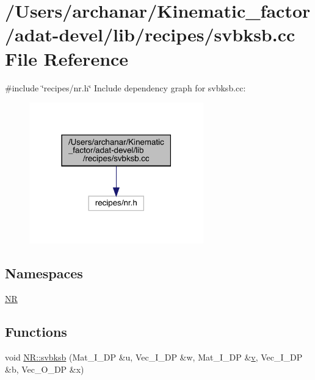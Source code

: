 \hypertarget{adat-devel_2lib_2recipes_2svbksb_8cc}{}\section{/\+Users/archanar/\+Kinematic\+\_\+factor/adat-\/devel/lib/recipes/svbksb.cc File Reference}
\label{adat-devel_2lib_2recipes_2svbksb_8cc}
{\ttfamily \#include \char`\"{}recipes/nr.\+h\char`\"{}}\newline
Include dependency graph for svbksb.\+cc\+:
\nopagebreak
\begin{figure}[H]
\begin{center}
\leavevmode
\includegraphics[width=214pt]{dd/d5b/adat-devel_2lib_2recipes_2svbksb_8cc__incl}
\end{center}
\end{figure}
\subsection*{Namespaces}
\begin{DoxyCompactItemize}
\item 
 \mbox{\hyperlink{namespaceNR}{NR}}
\end{DoxyCompactItemize}
\subsection*{Functions}
\begin{DoxyCompactItemize}
\item 
void \mbox{\hyperlink{namespaceNR_a5ae2173a7b10fd0f4e35baaad45f16f8}{N\+R\+::svbksb}} (Mat\+\_\+\+I\+\_\+\+DP \&u, Vec\+\_\+\+I\+\_\+\+DP \&w, Mat\+\_\+\+I\+\_\+\+DP \&\mbox{\hyperlink{adat__devel_2lib_2hadron_2hadron__timeslice_8cc_a716fc87f5e814be3ceee2405ed6ff22a}{v}}, Vec\+\_\+\+I\+\_\+\+DP \&b, Vec\+\_\+\+O\+\_\+\+DP \&x)
\end{DoxyCompactItemize}
